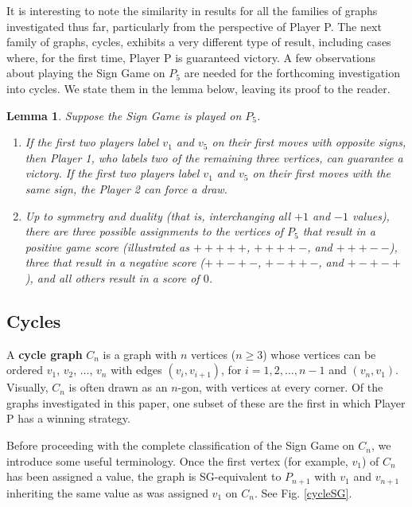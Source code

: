 \documentclass[amsart,11pt]{article}
\theoremstyle{dotless}
\theoremstyle{dotless}
\newtheorem{lem}[thm]{Lemma}
\begin{document}

It is interesting to note the similarity in results for all the families of graphs investigated thus far, particularly from the perspective of Player P. The next family of graphs, cycles, exhibits a very different type of result, including cases where, for the first time, Player P is guaranteed victory. A few observations about playing the Sign Game on $P_5$ are needed for the forthcoming investigation into cycles. We state them in the lemma below, leaving its proof to the reader.

\begin{lem} \label{p5lemma}
    Suppose the Sign Game is played on $P_5$.

    \begin{enumerate}
    \item If the first two players label $v_1$ and $v_5$ on their first moves with opposite signs, then Player 1, who labels two of the remaining three vertices, can guarantee a victory. If the first two players label $v_1$ and $v_5$ on their first moves with the same sign, the Player 2 can force a draw.

    \item Up to symmetry and duality (that is, interchanging all $+1$ and $-1$ values), there are three possible assignments to the vertices of $P_5$ that result in a positive game score (illustrated as $+++++$, $++++-$, and $+++--$), three that result in a negative score ($++-+-$, $+-++-$, and $+-+-+$), and all others result in a score of $0$.
\end{enumerate}
\end{lem}

\subsection{Cycles}

A \textbf{cycle graph} $C_n$ is a graph with $n$ vertices ($n \geq 3$) whose vertices can be ordered $v_1$, $v_2$, $\ldots$, $v_n$ with edges $\left(v_i,v_{i+1}\right)$, for $i = 1,2,\ldots,n-1$ and $\left(v_n,v_1\right)$. Visually, $C_n$ is often drawn as an $n$-gon, with vertices at every corner. Of the graphs investigated in this paper, one subset of these are the first in which Player P has a winning strategy.

Before proceeding with the complete classification of the Sign Game on $C_n$, we introduce some useful terminology. Once the first vertex (for example, $v_1$) of $C_n$ has been assigned a value, the graph is SG-equivalent to $P_{n+1}$ with $v_1$ and $v_{n+1}$ inheriting the same value as was assigned $v_1$ on $C_n$. See Fig. \ref{cycleSG}.
\end{document}

